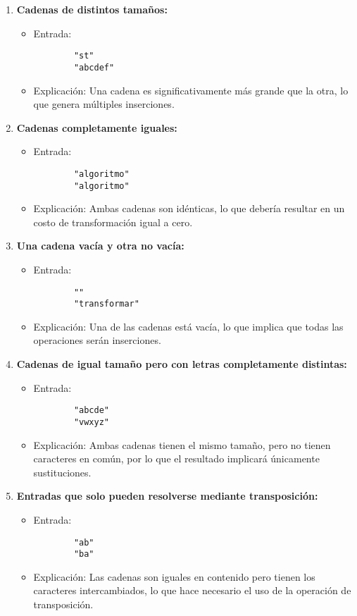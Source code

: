 \begin{enumerate}
    \item \textbf{Cadenas de distintos tamaños:}
    \begin{itemize}
        \item Entrada:
        \begin{verbatim}
        "st"
        "abcdef"
        \end{verbatim}
        \item Explicación: Una cadena es significativamente más grande que la otra, lo que genera múltiples inserciones.
    \end{itemize}

    \item \textbf{Cadenas completamente iguales:}
    \begin{itemize}
        \item Entrada:
        \begin{verbatim}
        "algoritmo"
        "algoritmo"
        \end{verbatim}
        \item Explicación: Ambas cadenas son idénticas, lo que debería resultar en un costo de transformación igual a cero.
    \end{itemize}

    \item \textbf{Una cadena vacía y otra no vacía:}
    \begin{itemize}
        \item Entrada:
        \begin{verbatim}
        ""
        "transformar"
        \end{verbatim}
        \item Explicación: Una de las cadenas está vacía, lo que implica que todas las operaciones serán inserciones.
    \end{itemize}

    \item \textbf{Cadenas de igual tamaño pero con letras completamente distintas:}
    \begin{itemize}
        \item Entrada:
        \begin{verbatim}
        "abcde"
        "vwxyz"
        \end{verbatim}
        \item Explicación: Ambas cadenas tienen el mismo tamaño, pero no tienen caracteres en común, por lo que el resultado implicará únicamente sustituciones.
    \end{itemize}

    \item \textbf{Entradas que solo pueden resolverse mediante transposición:}
    \begin{itemize}
        \item Entrada:
        \begin{verbatim}
        "ab"
        "ba"
        \end{verbatim}
        \item Explicación: Las cadenas son iguales en contenido pero tienen los caracteres intercambiados, lo que hace necesario el uso de la operación de transposición.
    \end{itemize}
\end{enumerate}
